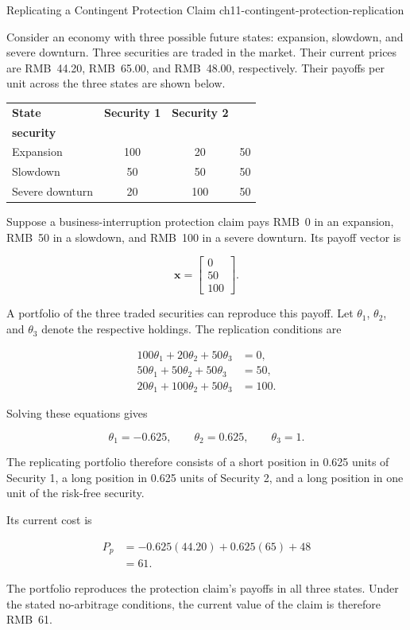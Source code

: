 \begin{example}{Replicating a Contingent Protection Claim}
{ch11-contingent-protection-replication}

Consider an economy with three possible future
states: expansion, slowdown, and severe downturn.
Three securities are traded in the market. Their
current prices are RMB~44.20, RMB~65.00, and
RMB~48.00, respectively. Their payoffs per unit
across the three states are shown below.

\begin{center}
\begin{tabular}{@{}lccc@{}}
\toprule
\textbf{State}
& \textbf{Security 1}
& \textbf{Security 2}
& \makecell{\textbf{Risk-free}\\\textbf{security}} \\
\midrule
Expansion       & 100 & 20  & 50 \\
Slowdown        & 50  & 50  & 50 \\
Severe downturn & 20  & 100 & 50 \\
\bottomrule
\end{tabular}
\end{center}

Suppose a business-interruption protection claim
pays RMB~0 in an expansion, RMB~50 in a slowdown,
and RMB~100 in a severe downturn. Its payoff vector
is

\[
\mathbf{x}
=
\begin{bmatrix}
0\\
50\\
100
\end{bmatrix}.
\]

A portfolio of the three traded securities can
reproduce this payoff. Let $\theta_1$, $\theta_2$,
and $\theta_3$ denote the respective holdings.
The replication conditions are

\begin{align*}
100\theta_1+20\theta_2+50\theta_3&=0,\\
50\theta_1+50\theta_2+50\theta_3&=50,\\
20\theta_1+100\theta_2+50\theta_3&=100.
\end{align*}

Solving these equations gives

\[
\theta_1=-0.625,\qquad
\theta_2=0.625,\qquad
\theta_3=1.
\]

The replicating portfolio therefore consists of
a short position in 0.625 units of Security 1,
a long position in 0.625 units of Security 2,
and a long position in one unit of the risk-free
security.

Its current cost is

\begin{align*}
P_p
&=-0.625(44.20)+0.625(65)+48\\
&=61.
\end{align*}

The portfolio reproduces the protection claim's
payoffs in all three states. Under the stated
no-arbitrage conditions, the current value of
the claim is therefore RMB~61.

\end{example}

